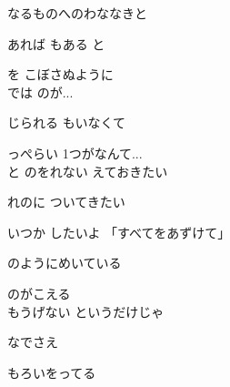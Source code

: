 {なるものへのわななきと

あれば もある と

を こぼさぬように
\\

では のが...

じられる もいなくて

っぺらい 1つがなんて...
\\

と のをれない えておきたい

れのに ついてきたい

いつか したいよ 「すべてをあずけて」

のようにめいている

のがこえる
\\

もうげない というだけじゃ

なでさえ 

もろいをってる

}